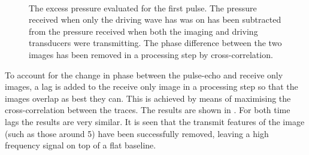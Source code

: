 \begin{figure}[t]%
  \centering
 \quad
 \quad\hspace{3mm}
  \\
 \quad
 \quad\hspace{3mm}
\caption{
    The excess pressure evaluated for the first pulse.  
    The pressure received when only the driving wave has was on has been subtracted from the pressure received when both the imaging and driving transducers were transmitting.
    The phase difference between the two images has been removed in a processing step by cross-correlation.
  }
  \label{fig:exp:1st:av:time:comp:control:cross}
\end{figure}

To account for the change in phase between the pulse-echo and receive only images,
a lag is added to the receive only image in a processing step so that the images 
overlap as best they can.  
This is achieved by means of maximising the cross-correlation between the traces.
The results are shown in .
For both time lags the results are very similar.
It is seen that the transmit features of the image (such as those around \unit{5}\micro\second) 
have been successfully removed, leaving a high frequency signal on top of a flat baseline.

